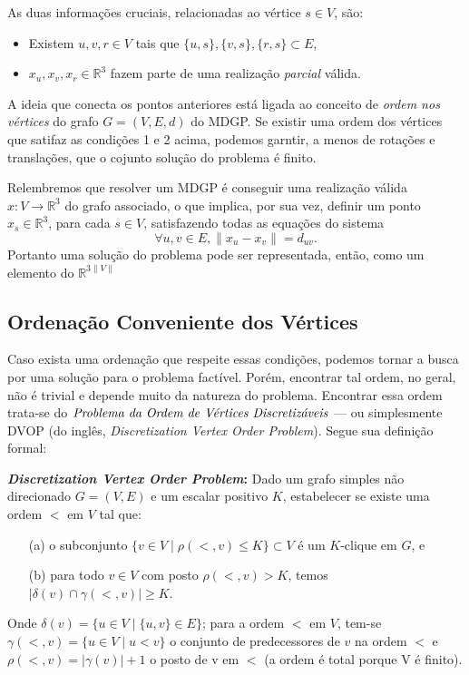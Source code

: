 \documentclass[a4paper,12pt]{article}
\begin{document}
	As duas informações cruciais, relacionadas ao vértice $s\in V$, são:
	\begin{itemize}
		\item Existem $u, v, r \in V$ tais que $\{u, s\}, \{v, s\}, \{r, s\}\subset E$,
		\item $x_{u}, x_{v}, x_{r} \in\mathbb{R}^{3}$ fazem parte de uma realização \textit{parcial} válida. 
	\end{itemize}
	
	A ideia que conecta os pontos anteriores está ligada ao conceito de \textit{ordem nos vértices} do grafo $G = (V, E, d)$ do MDGP. Se existir uma ordem dos vértices que satifaz as condições 1 e 2 acima, podemos garntir, a menos de rotações e translações, que o cojunto solução do problema é finito.
	
	Relembremos que resolver um MDGP é conseguir uma realização válida $x: V \rightarrow\mathbb{R}^{3}$ do grafo associado, o que implica, por sua vez, definir um ponto $x_{s}\in\mathbb{R}^3$, para cada $s\in V$, satisfazendo todas as equações do sistema
	$$
	\forall {u, v}\in E, \|x_{u} - x_{v}\| = d_{uv}.
	$$
	Portanto uma solução do problema pode ser representada, então, como um elemento do $\mathbb{R}^{3\|V\|}$
	
	\subsection{Ordenação Conveniente dos Vértices \label{sec:hc}}
	Caso exista uma ordenação que respeite essas condições, podemos tornar a busca por uma solução para o problema factível. Porém, encontrar tal ordem, no geral, não é trivial e depende muito da natureza do problema. Encontrar essa ordem trata-se do $\emph{Problema da Ordem de Vértices Discretizáveis}$ --- ou simplesmente DVOP (do inglês, \textit{Discretization Vertex Order Problem}). Segue sua definição formal:
	
	\begin{center}
		\begin{minipage}{0.9 \linewidth}
			\textbf{\textit{Discretization Vertex Order Problem}:} Dado um grafo simples não direcionado $G = (V, E)$ e um escalar positivo $K$, estabelecer se existe uma ordem $<$ em $V$ tal que: 
			\begin{enumerate}
				\item[(a)] o subconjunto $\{v \in V \mid \rho(<,v) \leq K\} \subset V$ é um $K$-clique em $G$, e
				\item[(b)] para todo $v \in V$ com posto $\rho(<,v) > K$, temos $|\delta(v) \cap \gamma(<,v)| \geq K$.
			\end{enumerate}
			Onde $\delta(v) = \{u \in V \mid  \{u,v\} \in E\}$; para a ordem $<$ em $V$, tem-se $\gamma(<,v) = \{u \in V \mid u < v\}$ o conjunto de predecessores de $v$ na ordem $<$ e $\rho(<,v) = |\gamma(v)| + 1$ o posto de v em $<$ (a ordem é total porque V é finito).
		\end{minipage}
	\end{center}
\end{document}
